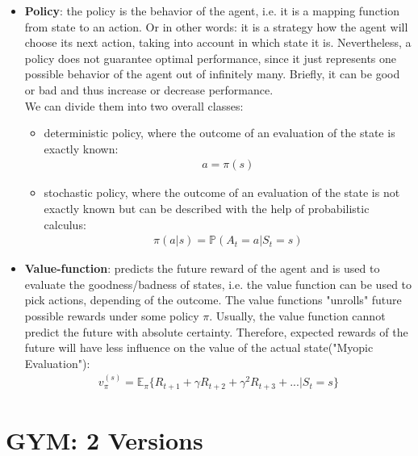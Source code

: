 \documentclass[a4paper, 11pt]{article}
\begin{document}
\begin{itemize}
    \item \textbf{Policy}: the policy is the behavior of the agent, i.e. it is a mapping function from state to an action. Or in other words: it is a strategy how the agent will choose its next action, taking into account in which state it is. Nevertheless, a policy does not guarantee optimal performance, since it just represents one possible behavior of the agent out of infinitely many. Briefly, it can be good or bad and thus increase or decrease performance.\\
     We can divide them into two overall classes:
    \begin{itemize}
    	\item deterministic policy, where the outcome of an evaluation of the state is exactly known: \\ 
    	\begin{align*}
    	a = \pi(s)
    	\end{align*}
    	\item stochastic policy, where the outcome of an evaluation of the state is not exactly known but can be described with the help of probabilistic calculus:\\
    	\begin{align*}
    		\pi( a | s) = \mathbb{P}(A_t =a | S_t = s)
    	\end{align*}
    \end{itemize}
    \vspace{0.5cm}
    \item \textbf{Value-function}: predicts the future reward of the agent and is used to evaluate the goodness/badness of states, i.e. the value function can be used to pick actions, depending of the outcome. The value functions "unrolls" future possible rewards under some policy $\pi$. Usually, the value function cannot predict the future with absolute certainty. Therefore, expected rewards of the future will have less influence on the value of the actual state("Myopic Evaluation"):\\
    \begin{align*}
    	v_{\pi} ^{(s)} = \mathbb{E}_{\pi} \lbrace R_{t+1}+ \gamma R_{t+2} + \gamma ^2 R_{t+3}+... | S_t = s \rbrace
    \end{align*}
\end{itemize}
\clearpage


\section{GYM: 2 Versions}
\end{document}
